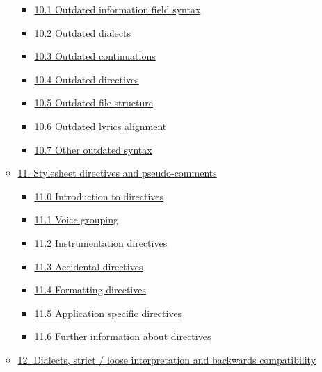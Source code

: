 \begin{itemize}
\begin{itemize}
    \begin{itemize}
    \item
      \protect\hyperlink{outdated_information_field_syntax}{10.1
      Outdated information field syntax}
    \item
      \protect\hyperlink{outdated_dialects}{10.2 Outdated dialects}
    \item
      \protect\hyperlink{outdated_continuations}{10.3 Outdated
      continuations}
    \item
      \protect\hyperlink{outdated_directives}{10.4 Outdated directives}
    \item
      \protect\hyperlink{outdated_file_structure}{10.5 Outdated file
      structure}
    \item
      \protect\hyperlink{outdated_lyrics_alignment}{10.6 Outdated lyrics
      alignment}
    \item
      \protect\hyperlink{other_outdated_syntax}{10.7 Other outdated
      syntax}
    \end{itemize}
  \item
    \protect\hyperlink{stylesheet_directives_and_pseudo-comments}{11.
    Stylesheet directives and pseudo-comments}

    \begin{itemize}
    \item
      \protect\hyperlink{introduction_to_directives}{11.0 Introduction
      to directives}
    \item
      \protect\hyperlink{voice_grouping}{11.1 Voice grouping}
    \item
      \protect\hyperlink{instrumentation_directives}{11.2
      Instrumentation directives}
    \item
      \protect\hyperlink{accidental_directives}{11.3 Accidental
      directives}
    \item
      \protect\hyperlink{formatting_directives}{11.4 Formatting
      directives}
    \item
      \protect\hyperlink{application_specific_directives}{11.5
      Application specific directives}
    \item
      \protect\hyperlink{further_information_about_directives}{11.6
      Further information about directives}
    \end{itemize}
  \item
    \protect\hyperlink{dialects_strict_loose_interpretation_and_backwards_compatibility}{12.
    Dialects, strict / loose interpretation and backwards compatibility}


\end{itemize}
\end{itemize}
